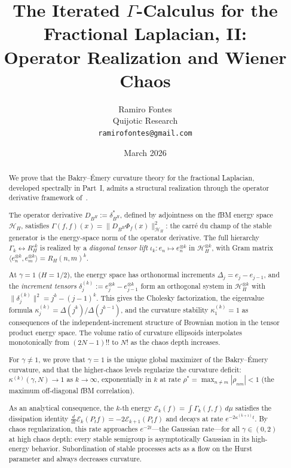 \documentclass[11pt,a4paper]{article}
\title{The Iterated $\Gamma$-Calculus for the Fractional Laplacian, II:\\
Operator Realization and Wiener Chaos}
\author{Ramiro Fontes\\
Quijotic Research\\
\texttt{ramirofontes@gmail.com}}
\date{March 2026}
\theoremstyle{plain}
\theoremstyle{definition}
\theoremstyle{remark}
\newcommand{\HH}{\mathcal{H}_H}
\begin{document}
\maketitle

\begin{abstract}
We prove that the Bakry--\'Emery curvature theory for the
fractional Laplacian, developed spectrally in Part~I,
admits a structural realization through the operator
derivative framework of~\cite{Fontes2026opderiv}.

The operator derivative $D_{B^H} := \delta_{B^H}^*$,
defined by adjointness on the fBM energy space~$\HH$,
satisfies
$\Gamma(f,f)(x) = \|D_{B^H}\Phi_f(x)\|^2_{\HH}$:
the carr\'e du champ of the stable generator is the
energy-space norm of the operator derivative.
The full hierarchy $\Gamma_k \leftrightarrow R_H^{\circ k}$
is realized by a \emph{diagonal tensor lift}
$\iota_k\colon e_n \mapsto e_n^{\otimes k}$
in $\HH^{\otimes k}$, with Gram matrix
$\langle e_n^{\otimes k}, e_m^{\otimes k}\rangle
= R_H(n,m)^k$.

At $\gamma = 1$ ($H = 1/2$), the energy space has
orthonormal increments $\Delta_j = e_j - e_{j-1}$,
and the \emph{increment tensors}
$\delta_j^{(k)} := e_j^{\otimes k} - e_{j-1}^{\otimes k}$
form an orthogonal system in $\HH^{\otimes k}$ with
$\|\delta_j^{(k)}\|^2 = j^k - (j{-}1)^k$.
This gives the Cholesky factorization, the eigenvalue
formula $\kappa_j^{(k)} = \Delta(j^k)/\Delta(j^{k-1})$,
and the curvature stability $\kappa_1^{(k)} = 1$
as consequences of the independent-increment structure
of Brownian motion in the tensor product energy space.
The volume ratio of curvature ellipsoids interpolates
monotonically from $(2N{-}1)!!$ to $N!$ as the chaos
depth increases.

For $\gamma \neq 1$, we prove that $\gamma = 1$ is
the unique global maximizer of the Bakry--\'Emery
curvature, and that the higher-chaos levels regularize
the curvature deficit: $\kappa^{(k)}(\gamma,N) \to 1$
as $k \to \infty$, exponentially in $k$ at rate
$\rho^* = \max_{n \neq m}|\rho_{nm}| < 1$ (the maximum
off-diagonal fBM correlation).

As an analytical consequence, the $k$-th energy
$\mathcal{E}_k(f) = \int \Gamma_k(f,f)\,d\mu$
satisfies the dissipation identity
$\frac{d}{dt}\mathcal{E}_k(P_t f)
= -2\mathcal{E}_{k+1}(P_t f)$
and decays at rate $e^{-2\kappa^{(k+1)}t}$.
By chaos regularization, this rate approaches
$e^{-2t}$---the Gaussian rate---for all
$\gamma \in (0,2)$ at high chaos depth: every
stable semigroup is asymptotically Gaussian
in its high-energy behavior.
Subordination of stable processes acts as a flow on
the Hurst parameter and always decreases curvature.
\end{abstract}
\end{document}
